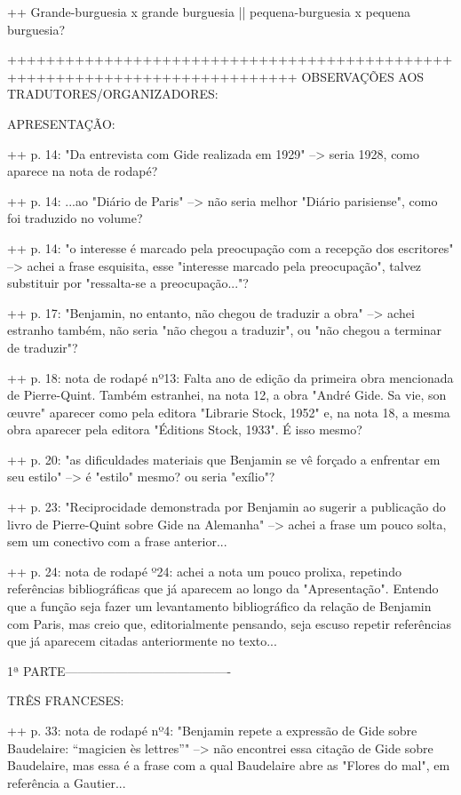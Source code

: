 ++ Grande-burguesia x grande burguesia || pequena-burguesia x pequena burguesia?

++++++++++++++++++++++++++++++++++++++++++++++++++++++++++++++++++++++++++++
OBSERVAÇÕES AOS TRADUTORES/ORGANIZADORES:

APRESENTAÇÃO:

++ p. 14: "Da entrevista com Gide realizada em 1929" --> seria 1928, como aparece na nota de rodapé?

++ p. 14: ...ao "Diário de Paris" --> não seria melhor "Diário parisiense", como foi traduzido no volume?

++ p. 14: "o interesse é marcado pela preocupação com a recepção dos escritores" --> achei a frase esquisita, esse "interesse marcado pela preocupação", talvez substituir por "ressalta-se a preocupação..."?

++ p. 17: "Benjamin, no entanto, não chegou de traduzir a obra" --> achei estranho também, não seria "não chegou a traduzir", ou "não chegou a terminar de traduzir"?

++ p. 18: nota de rodapé nº13: Falta ano de edição da primeira obra mencionada de Pierre-Quint. Também estranhei, na nota 12, a obra "André Gide. Sa vie, son œuvre" aparecer como pela editora "Librarie Stock, 1952" e, na nota 18, a mesma obra aparecer pela editora "Éditions Stock, 1933". É isso mesmo?

++ p. 20: "as dificuldades materiais que Benjamin se vê forçado a enfrentar em seu estilo" --> é "estilo" mesmo? ou seria "exílio"?

++ p. 23: "Reciprocidade demonstrada por Benjamin ao sugerir a publicação do livro de Pierre-Quint sobre Gide na Alemanha" --> achei a frase um pouco solta, sem um conectivo com a frase anterior...

++ p. 24: nota de rodapé º24: achei a nota um pouco prolixa, repetindo referências bibliográficas que já aparecem ao longo da "Apresentação". Entendo que a função seja fazer um levantamento bibliográfico da relação de Benjamin com Paris, mas creio que, editorialmente pensando, seja escuso repetir referências que já aparecem citadas anteriormente no texto...

1ª PARTE----------------------------------------

TRÊS FRANCESES:

++ p. 33: nota de rodapé nº4: "Benjamin repete a expressão de Gide sobre Baudelaire: “magicien ès lettres”" --> não encontrei essa citação de Gide sobre Baudelaire, mas essa é a frase com a qual Baudelaire abre as "Flores do mal", em referência a Gautier...

